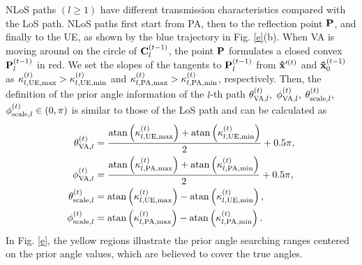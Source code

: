 \documentclass[journal,12pt,onecolumn,draftclsnofoot,]{IEEEtran}
\begin{document}
NLoS paths $(l\geq1)$ have different transmission characteristics compared with the LoS path.
NLoS paths first start from PA, then to the reflection point ${\bf{P}}$, and finally to the UE, as shown by the blue trajectory in Fig. \ref{e}(b). 
When VA is moving around on the circle of ${\bf{C}}^{(t-1 )}_l$, the point ${\bf{P}}$ formulates a closed convex ${\bf{P}}^{(t-1 )}_l$ in red. 
We set the slopes of the tangents to ${\bf{P}}^{(t-1 )}_l$ from ${\bf{\hat x}}{'^{(t )}}$ and ${\bf{\hat x}}_0^{({t - 1} )}$ as $\kappa_{l,{\rm{UE,max}}}^{(t)} > \kappa_{l,{\rm{UE,min}}}^{(t)}$ and $\kappa_{l,{\rm{PA,max}}}^{(t)} > \kappa_{l,{\rm{PA,min}}}^{(t)}$, respectively. 
Then, the definition of the prior angle information of the $l$-th path $\theta _{{\rm{VA}},l}^{(t )},$ $\phi _{{\rm{VA}},l}^{(t )},$ $\theta _{{\rm{scale}},l}^{(t )},$ $\phi _{{\rm{scale}},l}^{(t )}\in \left(0,\pi \right)$ is similar to those of the LoS path and can be calculated as
\begin{subequations}
\label{21}
\begin{align}
\theta _{{\rm VA},l}^{\left(t \right)} &= \frac{{{\mathop{\rm atan}\nolimits} \left({\kappa_{l,{\rm{UE,max}}}^{(t)}} \right) + {\rm atan} \left({\kappa_{l,{\rm{UE,min}}}^{(t)}} \right)}}{2} + 0.5\pi, \\
\phi _{{\rm VA},l}^{\left(t \right)} &= \frac{{{\rm atan} \left({\kappa_{l,{\rm{PA,max}}}^{(t)}} \right) + {\rm atan} \left({\kappa_{l,{\rm{PA,min}}}^{(t)}} \right)}}{2} + 0.5\pi, \\
\theta _{{\rm scale},l}^{\left(t \right)} &= {\rm atan} \left({\kappa_{l,{\rm{UE,max}}}^{(t)}} \right) - {\rm atan} \left({\kappa_{l,{\rm{UE,min}}}^{(t)}} \right),\\
\phi _{{\rm scale},l}^{\left(t \right)} &= {\rm atan} \left({\kappa_{l,{\rm{PA,max}}}^{(t)}} \right) - {\rm atan} \left({\kappa_{l,{\rm{PA,min}}}^{(t)}} \right).
\end{align}
\end{subequations}
In Fig. \ref{e}, the yellow regions illustrate the prior angle searching ranges centered on the prior angle values, which are believed to cover the true angles. 
\end{document}
